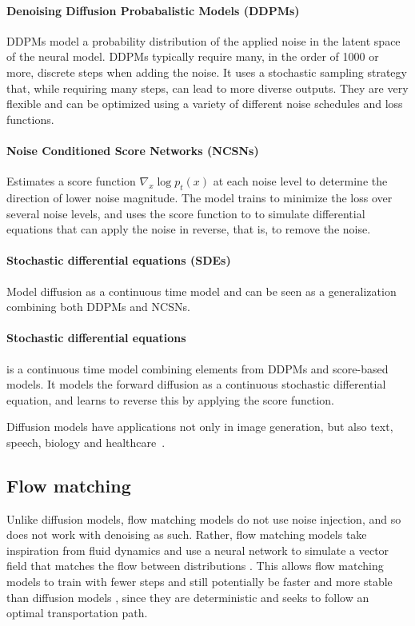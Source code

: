 \documentclass{article}
\begin{document}
\paragraph{Denoising Diffusion Probabalistic Models (DDPMs)} 
DDPMs model a probability distribution of the applied noise in the latent space of the neural model. DDPMs typically require many, in the order of 1000 or more, discrete steps when adding the noise. It uses a stochastic sampling strategy that, while requiring many steps, can lead to more diverse outputs. They are very flexible and can be optimized using a variety of different noise schedules and loss functions.

\paragraph{Noise Conditioned Score Networks (NCSNs)} 
Estimates a score function $\nabla_x \log p_t(x)$ at each noise level to determine the direction of lower noise magnitude. The model trains to minimize the loss over several noise levels, and uses the score function to to simulate differential equations that can apply the noise in reverse, that is, to remove the noise.

\paragraph{Stochastic differential equations (SDEs)} 
Model diffusion as a continuous time model and can be seen as a generalization combining both DDPMs and NCSNs.

\paragraph{Stochastic differential equations} is a continuous time model combining elements from DDPMs and score-based models. It models the forward diffusion as a continuous stochastic differential equation, and learns to reverse this by applying the score function.

Diffusion models have applications not only in image generation, but also text, speech, biology and healthcare~\cite{cao2024survey}.

\subsection{Flow matching}

Unlike diffusion models, flow matching models do not use noise injection, and so does not work with denoising as such. Rather, flow matching models take inspiration from fluid dynamics and use a neural network to simulate a vector field that matches the flow between distributions \cite{holderrieth2025introduction}. This allows flow matching models to train with fewer steps \cite{kornilov2024optimal} and still potentially be faster and more stable than diffusion models \cite{lipman2022flow}, since they are deterministic and seeks to follow an optimal transportation path. 
\end{document}
